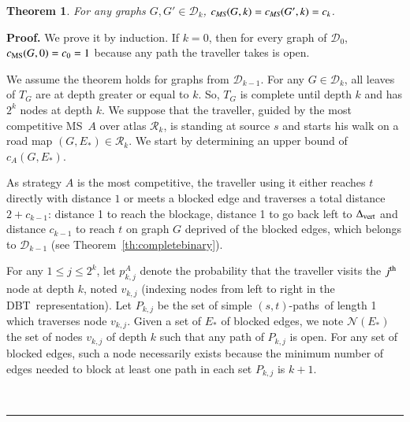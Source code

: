 \documentclass[preprint]{elsarticle}
\newtheorem{theorem}{Theorem}
\newenvironment{proof}[1][Proof]{\textbf{#1.} }{\ \rule{0.5em}{0.5em}}
\newcommand{\ith}[1]{#1^{\mbox{\scriptsize{th}}}}
\newcommand{\stpaths}{$(s,t)$-paths}
\newcommand{\mcalr}{\mathcal{R}}
\newcommand{\mcald}{\mathcal{D}}
\newcommand{\mcaln}{\mathcal{N}}
\newcommand{\mts}{MS}
\newcommand{\deltavert}{\Delta_{\mbox{\scriptsize{vert}}}}
\newcommand{\cms}{c_{\mbox{\scriptsize{MS}}}}
\newcommand{\ebt}{DBT}
\begin{document}
\begin{theorem}
For any graphs $G, G' \in \mcald_k$, $c_{\emph{\scriptsize{MS}}}(G,k) = c_{\emph{\scriptsize{MS}}}(G',k) = c_k$.
\label{th:equalcompetitive}
\end{theorem}
\begin{proof}
We prove it by induction. If $k = 0$, then for every graph of $\mcald_0$, $\cms(G,0) = c_0 = 1$ because any path the traveller takes is open.

We assume the theorem holds for graphs from $\mcald_{k-1}$. For any $G \in \mcald_k$, all leaves of $T_G$ are at depth greater or equal to $k$. So, $T_G$ is complete until depth $k$ and has $2^k$ nodes at depth $k$. We suppose that the traveller, guided by the most competitive \mts ~$A$ over atlas $\mcalr_k$, is standing at source $s$ and starts his walk on a road map $\left(G,E_*\right) \in \mcalr_k$. We start by determining an upper bound of $c_A(G, E_*)$.

As strategy $A$ is the most competitive, the traveller using it either reaches $t$ directly with distance $1$ or meets a blocked edge and traverses a total distance $2 + c_{k-1}$: distance 1 to reach the blockage, distance 1 to go back left to $\deltavert$ and distance $c_{k-1}$ to reach $t$ on graph $G$ deprived of the blocked edges, which belongs to $\mcald_{k-1}$ (see Theorem~\ref{th:completebinary}).

For any $1 \le j \le 2^k$, let $p_{k,j}^A$ denote the probability that the traveller visits the $\ith{j}$ node at depth $k$, noted $v_{k,j}$ (indexing nodes from left to right in the \ebt ~representation). 
Let $P_{k,j}$ be the set of simple \stpaths ~of length 1 which traverses node $v_{k,j}$.
Given a set of $E_*$ of blocked edges, we note $\mcaln(E_*)$ the set of nodes $v_{k,j}$ of depth $k$ such that any path of $P_{k,j}$ is open. For any set of blocked edges, such a node necessarily exists because the minimum number of edges needed to block at least one path in each set $P_{k,j}$ is $k+1$. 


\end{proof}
\end{document}

